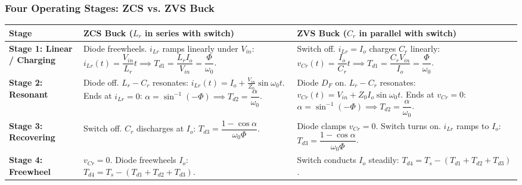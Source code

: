 \subsubsection*{Four Operating Stages: ZCS vs. ZVS Buck}
\vspace{-4pt}
\begin{center}
\vspace{-6pt}
\footnotesize
\renewcommand{\arraystretch}{1.15}
\begin{tabularx}{\textwidth}{@{} >{\raggedright\arraybackslash}p{2.6cm} >{\raggedright\arraybackslash}X >{\raggedright\arraybackslash}X @{}}
\toprule
\textbf{Stage} & \textbf{ZCS Buck ($L_r$ in series with switch)} & \textbf{ZVS Buck ($C_r$ in parallel with switch)} \\
\midrule
\textbf{Stage 1: Linear / Charging} &
Diode freewheels. $i_{Lr}$ ramps linearly under $V_{in}$: \newline
$i_{Lr}(t) = \dfrac{V_{in}}{L_r} t \implies T_{d1} = \dfrac{L_r I_o}{V_{in}} = \dfrac{\Phi}{\omega_0}$. &
Switch off. $i_{Lr} = I_o$ charges $C_r$ linearly: \newline
$v_{Cr}(t) = \dfrac{I_o}{C_r} t \implies T_{d1} = \dfrac{C_r V_{in}}{I_o} = \dfrac{\Phi}{\omega_0}$. \\

\textbf{Stage 2: Resonant} &
Diode off. $L_r-C_r$ resonates: $i_{Lr}(t) = I_o + \frac{V_{in}}{Z_0}\sin\omega_0 t$. \newline
Ends at $i_{Lr}=0$: $\alpha = \sin^{-1}(-\Phi) \implies T_{d2} = \dfrac{\alpha}{\omega_0}$. &
Diode $D_F$ on. $L_r-C_r$ resonates: $v_{Cr}(t) = V_{in} + Z_0 I_o\sin\omega_0 t$. \newline
Ends at $v_{Cr}=0$: $\alpha = \sin^{-1}(-\Phi) \implies T_{d2} = \dfrac{\alpha}{\omega_0}$. \\

\textbf{Stage 3: Recovering} &
Switch off. $C_r$ discharges at $I_o$: $T_{d3} = \dfrac{1-\cos\alpha}{\omega_0 \Phi}$. &
Diode clamps $v_{Cr}=0$. Switch turns on. $i_{Lr}$ ramps to $I_o$: $T_{d3} = \dfrac{1-\cos\alpha}{\omega_0 \Phi}$. \\

\textbf{Stage 4: Freewheel} &
$v_{Cr}=0$. Diode freewheels $I_o$: $T_{d4} = T_s - (T_{d1}+T_{d2}+T_{d3})$. &
Switch conducts $I_o$ steadily: $T_{d4} = T_s - (T_{d1}+T_{d2}+T_{d3})$. \\
\bottomrule
\end{tabularx}
\end{center}

\vspace{-6pt}
